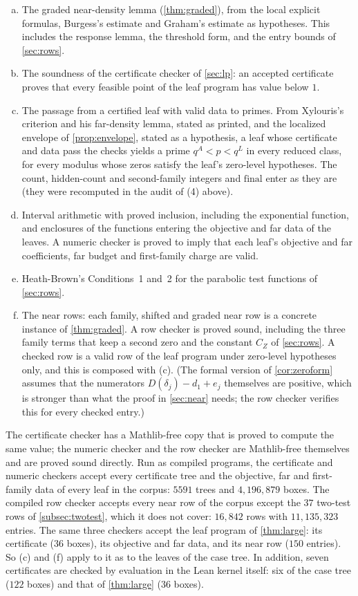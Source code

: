 \begin{enumerate}[(a)]
  \item The graded near-density lemma (\cref{thm:graded}), from the local explicit formulas,
    Burgess's estimate and Graham's estimate as hypotheses. This includes the response lemma,
    the threshold form, and the entry bounds of \cref{sec:rows}.
  \item The soundness of the certificate checker of \cref{sec:lp}: an accepted certificate
    proves that every feasible point of the leaf program has value below $1$.
  \item The passage from a certified leaf with valid data to primes. From Xylouris's criterion
    and his far-density lemma, stated as printed, and the localized envelope of
    \cref{prop:envelope}, stated as a hypothesis, a leaf whose certificate and data pass the checks
    yields a prime $q^{A}<p<q^{L}$ in every reduced class, for every modulus whose zeros satisfy
    the leaf's zero-level hypotheses. The count, hidden-count and second-family integers and
    $\mathrm{final}$ enter as they are (they were recomputed in the audit of (4) above).
  \item Interval arithmetic with proved inclusion, including the exponential function, and
    enclosures of the functions entering the objective and far data of the leaves. A numeric
    checker is proved to imply that each leaf's objective and far coefficients, far budget and
    first-family charge are valid.
  \item Heath-Brown's Conditions~1 and~2 for the parabolic test functions of \cref{sec:rows}.
  \item The near rows: each family, shifted and graded near row is a concrete instance of
    \cref{thm:graded}. A row checker is proved sound, including the three family terms that keep a second zero and the constant
    $C_Z$ of \cref{sec:rows}. A checked row is a valid row of the leaf program under
    zero-level hypotheses only, and this is composed with (c). (The formal version of
    \cref{cor:zeroform} assumes that the numerators $D(\delta_j)-d_1+e_j$ themselves are positive,
    which is stronger than what the proof in \cref{sec:near} needs; the row checker verifies this
    for every checked entry.)
\end{enumerate}
The certificate checker has a Mathlib-free copy that is proved to compute the same value; the
numeric checker and the row checker are Mathlib-free themselves and are proved sound directly.
Run as compiled programs, the certificate and numeric checkers accept every certificate tree and
the objective, far and first-family data of every leaf in the corpus: $5591$ trees and
$4{,}196{,}879$ boxes.
The compiled row checker accepts every near row of the corpus except the $37$ two-test rows of
\cref{subsec:twotest}, which it does not cover: $16{,}842$ rows with $11{,}135{,}323$ entries. The same
three checkers accept the leaf program of \cref{thm:large}: its certificate ($36$ boxes), its
objective and far data, and its near row ($150$ entries). So (c) and (f) apply to it as to the leaves of the
case tree. In addition, seven certificates are checked by evaluation in the Lean kernel itself:
six of the case tree ($122$ boxes) and that of \cref{thm:large} ($36$ boxes).

